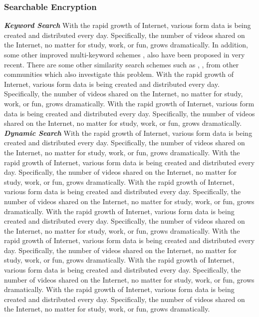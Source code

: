 \documentclass[a4paper,12pt,UTF8]{ctexart}
\begin{document}
\begin{spacing}{1.1}
\subsubsection{Searchable Encryption}
\emph{\textbf{Keyword Search}} With the rapid growth of Internet, various form data is being created and distributed every day. Specifically, the number of videos shared on the Internet, no matter for study, work, or fun, grows dramatically. In addition, some other improved multi-keyword schemes \cite{DBLP:journals/tdsc/LiYLLZS16}, \cite{DBLP:journals/tpds/XiaWSW16} also have been proposed in very recent. 
\newline\indent There are some other similarity search schemes such as \cite{lv2007multi}, \cite{wang2014privacy}, \cite{aswani2012fuzzy} \cite{liinstantcryptogram} from other communities which also investigate this problem. 
\newline\indent With the rapid growth of Internet, various form data is being created and distributed every day. Specifically, the number of videos shared on the Internet, no matter for study, work, or fun, grows dramatically. With the rapid growth of Internet, various form data is being created and distributed every day. Specifically, the number of videos shared on the Internet, no matter for study, work, or fun, grows dramatically.  \vspace{3mm}
\newline\indent\emph{\textbf{Dynamic Search}} With the rapid growth of Internet, various form data is being created and distributed every day. Specifically, the number of videos shared on the Internet, no matter for study, work, or fun, grows dramatically. With the rapid growth of Internet, various form data is being created and distributed every day. Specifically, the number of videos shared on the Internet, no matter for study, work, or fun, grows dramatically. With the rapid growth of Internet, various form data is being created and distributed every day. Specifically, the number of videos shared on the Internet, no matter for study, work, or fun, grows dramatically. With the rapid growth of Internet, various form data is being created and distributed every day. Specifically, the number of videos shared on the Internet, no matter for study, work, or fun, grows dramatically. 
\newline\indent With the rapid growth of Internet, various form data is being created and distributed every day. Specifically, the number of videos shared on the Internet, no matter for study, work, or fun, grows dramatically. With the rapid growth of Internet, various form data is being created and distributed every day. Specifically, the number of videos shared on the Internet, no matter for study, work, or fun, grows dramatically. With the rapid growth of Internet, various form data is being created and distributed every day. Specifically, the number of videos shared on the Internet, no matter for study, work, or fun, grows dramatically.  \vspace{3mm}

\end{spacing}
\end{document}
